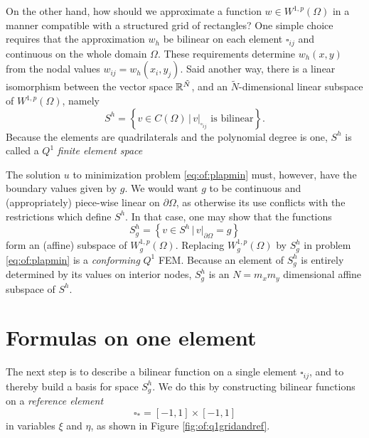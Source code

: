 On the other hand, how should we approximate a function $w \in W^{1,p}(\Omega)$ in a manner compatible with a structured grid of rectangles?  One simple choice requires that the approximation $w_h$ be bilinear on each element $\square_{ij}$ and continuous on the whole domain $\Omega$.  These requirements determine $w_h(x,y)$ from the nodal values $w_{ij} = w_h(x_i,y_j)$.  Said another way, there is a linear isomorphism between the vector space $\mathbb{R}^{\tilde N}$, and an $\tilde N$-dimensional linear subspace of $W^{1,p}(\Omega)$, namely
\begin{equation}
S^h = \left\{v \in C(\Omega) \, \Big| \, v|_{\square_{ij}} \text{ is bilinear}\right\}. \label{eq:of:Shdefn}
\end{equation}
Because the elements are quadrilaterals and the polynomial degree is one, $S^h$ is called a $Q^1$ \emph{finite element space} \citep{Elmanetal2005}

The solution $u$ to minimization problem \eqref{eq:of:plapmin} must, however, have the boundary values given by $g$.  We would want $g$ to be continuous and (appropriately) piece-wise linear on $\partial\Omega$, as otherwise its use conflicts with the restrictions which define $S^h$.  In that case, one may show that the functions
\begin{equation}
S_g^h = \left\{v \in S^h \, \Big| \, v|_{\partial \Omega} = g\right\} \label{eq:of:Sghdefn}
\end{equation}
form an (affine) subspace of $W_g^{1,p}(\Omega)$.  Replacing $W_g^{1,p}(\Omega)$ by $S_g^h$ in problem \eqref{eq:of:plapmin} is a \emph{conforming} $Q^1$ FEM.  Because an element of $S_g^h$ is entirely determined by its values on interior nodes, $S_g^h$ is an $N=m_x m_y$ dimensional affine subspace of $S^h$.


\section{Formulas on one element}

The next step is to describe a bilinear function on a single element $\square_{ij}$, and to thereby build a basis for space $S_g^h$.  We do this by constructing bilinear functions on a \emph{reference element}
    $$\square_\ast = [-1,1]\times[-1,1]$$
in variables $\xi$ and $\eta$, as shown in Figure \ref{fig:of:q1gridandref}.

